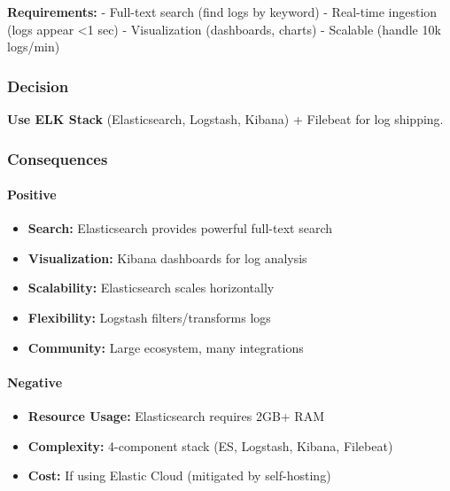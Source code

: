 \documentclass[
]{article}
\providecommand{\tightlist}{%
  \setlength{\itemsep}{0pt}\setlength{\parskip}{0pt}}
\begin{document}
\textbf{Requirements:} - Full-text search (find logs by keyword) -
Real-time ingestion (logs appear \textless1 sec) - Visualization
(dashboards, charts) - Scalable (handle 10k logs/min)

\hypertarget{decision-9}{%
\subsubsection{Decision}\label{decision-9}}

\textbf{Use ELK Stack} (Elasticsearch, Logstash, Kibana) + Filebeat for
log shipping.

\hypertarget{consequences-9}{%
\subsubsection{Consequences}\label{consequences-9}}

\hypertarget{positive-9}{%
\paragraph{Positive}\label{positive-9}}

\begin{itemize}
\tightlist
\item
  \textbf{Search:} Elasticsearch provides powerful full-text search
\item
  \textbf{Visualization:} Kibana dashboards for log analysis
\item
  \textbf{Scalability:} Elasticsearch scales horizontally
\item
  \textbf{Flexibility:} Logstash filters/transforms logs
\item
  \textbf{Community:} Large ecosystem, many integrations
\end{itemize}

\hypertarget{negative-9}{%
\paragraph{Negative}\label{negative-9}}

\begin{itemize}
\tightlist
\item
  \textbf{Resource Usage:} Elasticsearch requires 2GB+ RAM
\item
  \textbf{Complexity:} 4-component stack (ES, Logstash, Kibana,
  Filebeat)
\item
  \textbf{Cost:} If using Elastic Cloud (mitigated by self-hosting)
\end{itemize}
\end{document}
